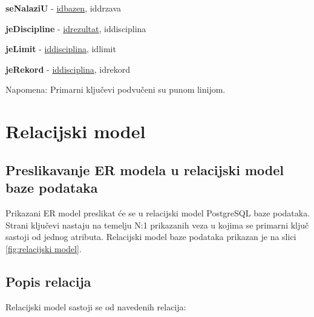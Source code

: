 \documentclass[times, utf8, zavrsni]{fer}
\begin{document}
\vspace{\baselineskip}

\textbf{seNalaziU} - \underline{idbazen}, iddrzava 

\vspace{\baselineskip}

\textbf{jeDiscipline} - \underline{idrezultat}, iddisciplina

\vspace{\baselineskip}

\textbf{jeLimit} - \underline{iddisciplina}, idlimit 

\vspace{\baselineskip}

\textbf{jeRekord} - \underline{iddisciplina}, idrekord

\vspace{\baselineskip}

Napomena: Primarni ključevi podvučeni su punom linijom.

\vspace{\baselineskip}


\section{Relacijski model}

\subsection{Preslikavanje ER modela u relacijski model baze podataka}

Prikazani ER model preslikat će se u relacijski model PostgreSQL baze podataka. Strani ključevi nastaju na temelju
N:1 prikazanih veza u kojima se primarni ključ sastoji od jednog atributa. Relacijski model baze podataka prikazan je
na slici \ref{fig:relacijski model}.

\subsection{Popis relacija}

\vspace{\baselineskip}

Relacijski model sastoji se od navedenih relacija:

\vspace{\baselineskip}
\end{document}
